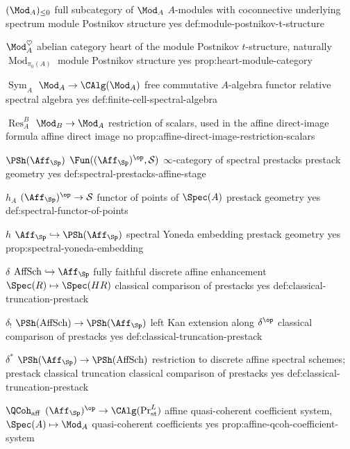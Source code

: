 \begin{longtable}
\CanonicalEntry
{\((\Mod_A)_{\leq0}\)}
{full subcategory of \(\Mod_A\)}
{\(A\)-modules with coconnective underlying spectrum}
{module Postnikov structure}
{yes}
{def:module-postnikov-t-structure}

\CanonicalEntry
{\(\Mod_A^\heartsuit\)}
{abelian category}
{heart of the module Postnikov \(t\)-structure, naturally \(\operatorname{Mod}_{\pi_0(A)}\)}
{module Postnikov structure}
{yes}
{prop:heart-module-category}

\CanonicalEntry
{\(\operatorname{Sym}_A\)}
{\(\Mod_A\to\CAlg(\Mod_A)\)}
{free commutative \(A\)-algebra functor}
{relative spectral algebra}
{yes}
{def:finite-cell-spectral-algebra}

\CanonicalEntry
{\(\operatorname{Res}_A^B\)}
{\(\Mod_B\to\Mod_A\)}
{restriction of scalars, used in the affine direct-image formula}
{affine direct image}
{no}
{prop:affine-direct-image-restriction-scalars}

\CanonicalEntry
{\(\PSh(\Aff_{\Sp})\)}
{\(\Fun((\Aff_{\Sp})^{\op},\mathcal S)\)}
{\(\infty\)-category of spectral prestacks}
{prestack geometry}
{yes}
{def:spectral-prestacks-affine-stage}

\CanonicalEntry
{\(h_A\)}
{\((\Aff_{\Sp})^{\op}\to\mathcal S\)}
{functor of points of \(\Spec(A)\)}
{prestack geometry}
{yes}
{def:spectral-functor-of-points}

\CanonicalEntry
{\(h\)}
{\(\Aff_{\Sp}\hookrightarrow\PSh(\Aff_{\Sp})\)}
{spectral Yoneda embedding}
{prestack geometry}
{yes}
{prop:spectral-yoneda-embedding}

\CanonicalEntry
{\(\delta\)}
{\(\operatorname{AffSch}\hookrightarrow\Aff_{\Sp}\)}
{fully faithful discrete affine enhancement \(\Spec(R)\mapsto\Spec(HR)\)}
{classical comparison of prestacks}
{yes}
{def:classical-truncation-prestack}

\CanonicalEntry
{\(\delta_!\)}
{\(\PSh(\operatorname{AffSch})\to\PSh(\Aff_{\Sp})\)}
{left Kan extension along \(\delta^{\op}\)}
{classical comparison of prestacks}
{yes}
{def:classical-truncation-prestack}

\CanonicalEntry
{\(\delta^*\)}
{\(\PSh(\Aff_{\Sp})\to\PSh(\operatorname{AffSch})\)}
{restriction to discrete affine spectral schemes; prestack classical truncation}
{classical comparison of prestacks}
{yes}
{def:classical-truncation-prestack}

\CanonicalEntry
{\(\QCoh_{\mathrm{aff}}\)}
{\((\Aff_{\Sp})^{\op}\to\CAlg(\Pr^L_{\mathrm{st}})\)}
{affine quasi-coherent coefficient system, \(\Spec(A)\mapsto\Mod_A\)}
{quasi-coherent coefficients}
{yes}
{prop:affine-qcoh-coefficient-system}


\end{longtable}
